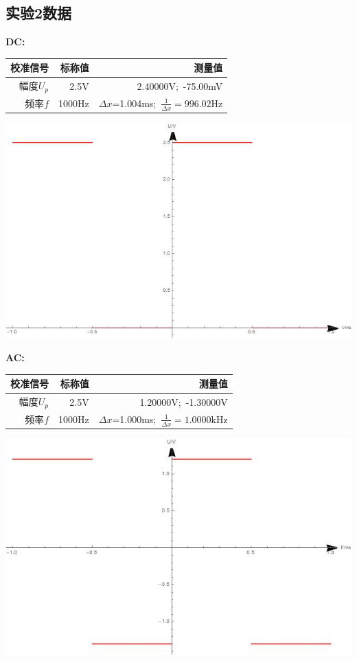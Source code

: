 \documentclass[a4paper,11pt,UTF8]{ctexart}
\begin{document}
\subsection{实验2数据}
	\textbf{DC:}
	\begin{center}
	\begin{tabular}{|r|r|r|}\hline
	校准信号 & 标称值 & 测量值\\\hline
	幅度$U_p$ & 2.5V & 2.40000V;~-75.00mV\\\hline
	频率$f$ & 1000Hz & $\Delta x$=1.004ms;~$\frac{1}{\Delta x}=996.02$Hz\\\hline
		\end{tabular}
		\end{center}
		\includegraphics[scale=0.4]{DC}
	\par\textbf{AC:}
	\begin{center}
	\begin{tabular}{|r|r|r|}\hline
	校准信号 & 标称值 & 测量值\\\hline
	幅度$U_p$ & 2.5V & 1.20000V;~-1.30000V\\\hline
	频率$f$ & 1000Hz & $\Delta x$=1.000ms;~$\frac{1}{\Delta x}=1.0000$kHz\\\hline
		\end{tabular}
		\end{center}
		\includegraphics[scale=0.4]{AC}
\end{document}
